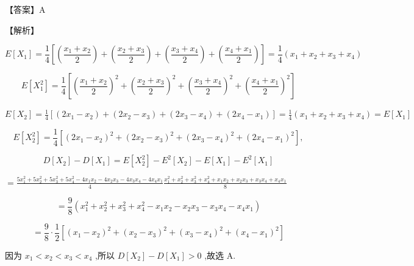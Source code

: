 \documentclass[10pt]{article}
\begin{document}
【答案】A

【解析】

\[
E\left\lbrack  {X}_{1}\right\rbrack   = \frac{1}{4}\left\lbrack  {\left( \frac{{x}_{1} + {x}_{2}}{2}\right)  + \left( \frac{{x}_{2} + {x}_{3}}{2}\right)  + \left( \frac{{x}_{3} + {x}_{4}}{2}\right)  + \left( \frac{{x}_{4} + {x}_{1}}{2}\right) }\right\rbrack   = \frac{1}{4}\left( {{x}_{1} + {x}_{2} + {x}_{3} + {x}_{4}}\right)
\]

\[
E\left\lbrack  {X}_{1}^{2}\right\rbrack   = \frac{1}{4}\left\lbrack  {{\left( \frac{{x}_{1} + {x}_{2}}{2}\right) }^{2} + {\left( \frac{{x}_{2} + {x}_{3}}{2}\right) }^{2} + {\left( \frac{{x}_{3} + {x}_{4}}{2}\right) }^{2} + {\left( \frac{{x}_{4} + {x}_{1}}{2}\right) }^{2}}\right\rbrack
\]

\(E\left\lbrack  {X}_{2}\right\rbrack   = \frac{1}{4}\left\lbrack  {\left( {2{x}_{1} - {x}_{2}}\right)  + \left( {2{x}_{2} - {x}_{3}}\right)  + \left( {2{x}_{3} - {x}_{4}}\right)  + \left( {2{x}_{4} - {x}_{1}}\right) }\right\rbrack   = \frac{1}{4}\left( {{x}_{1} + {x}_{2} + {x}_{3} + {x}_{4}}\right)  = E\left\lbrack  {X}_{1}\right\rbrack\)

\[
E\left\lbrack  {X}_{2}^{2}\right\rbrack   = \frac{1}{4}\left\lbrack  {{\left( 2{x}_{1} - {x}_{2}\right) }^{2} + {\left( 2{x}_{2} - {x}_{3}\right) }^{2} + {\left( 2{x}_{3} - {x}_{4}\right) }^{2} + {\left( 2{x}_{4} - {x}_{1}\right) }^{2}}\right\rbrack  ,
\]

\[
D\left\lbrack  {X}_{2}\right\rbrack   - D\left\lbrack  {X}_{1}\right\rbrack   = E\left\lbrack  {X}_{2}^{2}\right\rbrack   - {E}^{2}\left\lbrack  {X}_{2}\right\rbrack   - E\left\lbrack  {X}_{1}\right\rbrack   - {E}^{2}\left\lbrack  {X}_{1}\right\rbrack
\]

\(= \frac{5{x}_{1}^{2} + 5{x}_{2}^{2} + 5{x}_{3}^{2} + 5{x}_{4}^{2} - 4{x}_{1}{x}_{2} - 4{x}_{2}{x}_{3} - 4{x}_{3}{x}_{4} - 4{x}_{4}{x}_{1}}{4}\frac{{x}_{1}^{2} + {x}_{2}^{2} + {x}_{3}^{2} + {x}_{4}^{2} + {x}_{1}{x}_{2} + {x}_{2}{x}_{3} + {x}_{3}{x}_{4} + {x}_{4}{x}_{1}}{8}\)

\[
= \frac{9}{8}\left( {{x}_{1}^{2} + {x}_{2}^{2} + {x}_{3}^{2} + {x}_{4}^{2} - {x}_{1}{x}_{2} - {x}_{2}{x}_{3} - {x}_{3}{x}_{4} - {x}_{4}{x}_{1}}\right)
\]

\[
= \frac{9}{8} \cdot  \frac{1}{2}\left\lbrack  {{\left( {x}_{1} - {x}_{2}\right) }^{2} + {\left( {x}_{2} - {x}_{3}\right) }^{2} + {\left( {x}_{3} - {x}_{4}\right) }^{2} + {\left( {x}_{4} - {x}_{1}\right) }^{2}}\right\rbrack
\]

因为 \({x}_{1} < {x}_{2} < {x}_{3} < {x}_{4}\) ,所以 \(D\left\lbrack  {X}_{2}\right\rbrack   - D\left\lbrack  {X}_{1}\right\rbrack   > 0\) ,故选 A.
\end{document}
